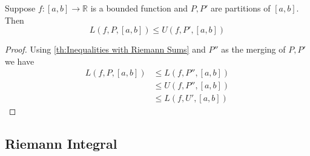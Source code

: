 \begin{ftheo}
    Suppose $ f : [a,b] \to \mathbb{R}  $ is a bounded function and $ P, P' $ are
    partitions of $ [a,b]  $. Then 
    \[
   L\left( f , P, [a,b] \right) \leq U\left( f , P', [a,b] \right)
    \]
    \label{th:Lower Riemann sums leq Upper Riemann Sums}
\end{ftheo}
\begin{proof}
    Using \ref{th:Inequalities with Riemann Sums} and $ P'' $ as the merging of $ P, P' $ we have 
    \begin{align*}
        L\left( f , P, [a,b] \right) &\leq L\left( f , P'', [a,b] \right) \\ 
                                     &\leq U\left( f , P'', [a,b] \right)\\ 
                                     &\leq L\left( f , U', [a,b] \right) 
    \end{align*} 
\end{proof}
\subsection{Riemann Integral}
\label{subsec:Riemann Integral}

